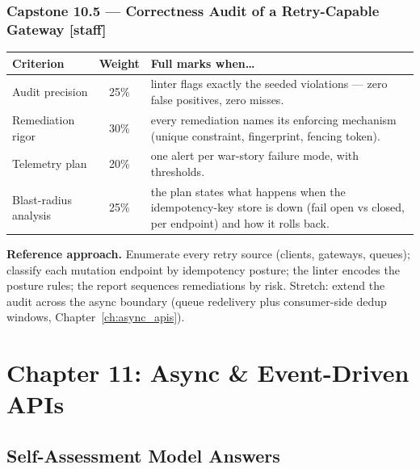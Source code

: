 \subsubsection*{Capstone 10.5 --- Correctness Audit of a Retry-Capable Gateway [staff]}
\begin{center}\small
\begin{tabularx}{\textwidth}{l c X}
\toprule
\textbf{Criterion} & \textbf{Weight} & \textbf{Full marks when\ldots} \\
\midrule
Audit precision & 25\% & linter flags exactly the seeded violations --- zero false positives, zero misses. \\
Remediation rigor & 30\% & every remediation names its enforcing mechanism (unique constraint, fingerprint, fencing token). \\
Telemetry plan & 20\% & one alert per war-story failure mode, with thresholds. \\
Blast-radius analysis & 25\% & the plan states what happens when the idempotency-key store is down (fail open vs closed, per endpoint) and how it rolls back. \\
\bottomrule
\end{tabularx}
\end{center}
\textbf{Reference approach.} Enumerate every retry source (clients,
gateways, queues); classify each mutation endpoint by idempotency posture;
the linter encodes the posture rules; the report sequences remediations by
risk. Stretch: extend the audit across the async boundary (queue
redelivery plus consumer-side dedup windows, Chapter~\ref{ch:async_apis}).

\section{Chapter 11: Async \& Event-Driven APIs}
\label{sec:sol-ch11}

\subsection{Self-Assessment Model Answers}


